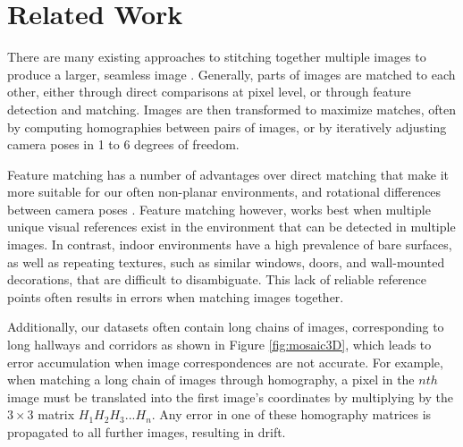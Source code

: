 \documentclass[]{spie}  %
\begin{document}
\section{Related Work}
\label{sec:relatedWork}
There are many existing approaches to stitching together multiple
images to produce a larger, seamless image \cite{szeliski2006image,
  agarwalapanoramas, wangmultipleviews, coorg1997matching,
  debevechybrid, bernardinimultiplescans}. Generally, parts of images
are matched to each other, either through direct comparisons at pixel
level, or through feature detection and matching. Images are then
transformed to maximize matches, often by computing homographies
between pairs of images, or by iteratively adjusting camera poses in 1
to 6 degrees of freedom.

Feature matching has a number of advantages over direct matching that
make it more suitable for our often non-planar environments, and
rotational differences between camera poses
\cite{szeliski2006image}. Feature matching however, works best when
multiple unique visual references exist in the environment that can be
detected in multiple images. In contrast, indoor environments have a
high prevalence of bare surfaces, as well as repeating textures, such
as similar windows, doors, and wall-mounted decorations, that are
difficult to disambiguate. This lack of reliable reference points
often results in errors when matching images together.

Additionally, our datasets often contain long chains of images,
corresponding to long hallways and corridors as shown in Figure
\ref{fig:mosaic3D}, which leads to error accumulation when image
correspondences are not accurate. For example, when matching a long
chain of images through homography, a pixel in the $nth$ image must be
translated into the first image's coordinates by multiplying by the
$3\times3$ matrix $H_1 H_2 H_3 ... H_n$. Any error in one of these
homography matrices is propagated to all further images, resulting in
drift.
\end{document}
